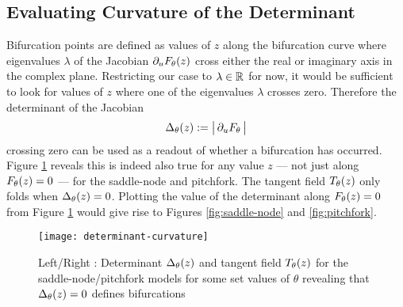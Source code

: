 \subsection{Evaluating Curvature of the Determinant}
Bifurcation points are defined as values of $z$ along the bifurcation curve where eigenvalues $\lambda$ of the Jacobian $\partial_u F_{\theta}(z)$ cross either the real or imaginary axis in the complex plane. Restricting our case to $\lambda\in\mathbb{R}$ for now, it would be sufficient to look for values of $z$ where one of the eigenvalues $\lambda$ crosses zero. Therefore the determinant of the Jacobian
\begin{align}
    \Delta_{\theta}(z) := \big|\,\partial_u F_{\theta}\,\big|
\end{align}
crossing zero can be used as a readout of whether a bifurcation has occurred. Figure \ref{fig:determinant-curvature} reveals this is indeed also true for any value $z$ --- not just along $F_{\theta}(z)=0$ --- for the saddle-node and pitchfork. The tangent field $T_{\theta}(z)$ only folds when $\Delta_{\theta}(z)=0$. Plotting the value of the determinant along $F_{\theta}(z)=0$ from Figure \ref{fig:determinant-curvature} would give rise to Figures \ref{fig:saddle-node} and \ref{fig:pitchfork}.

\begin{figure}[H]
\centering{}
\captionsetup{justification=centering}
\texttt{[image: determinant-curvature]}
\caption{Left/Right : Determinant $\Delta_{\theta}(z)$ and tangent field $T_{\theta}(z)$ for the saddle-node/pitchfork models for some set values of $\theta$ revealing that $\Delta_{\theta}(z)=0$ defines bifurcations}
\label{fig:determinant-curvature}
\end{figure}

